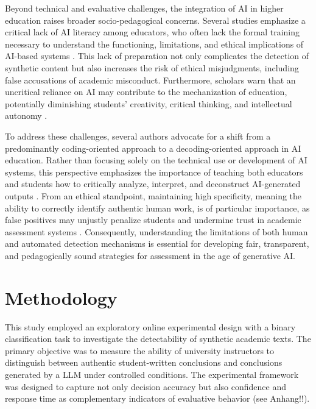 \documentclass[12pt]{article}
\begin{document}
Beyond technical and evaluative challenges, the integration of AI in higher education raises broader socio-pedagogical concerns. Several studies emphasize a critical lack of AI literacy among educators, who often lack the formal training necessary to understand the functioning, limitations, and ethical implications of AI-based systems \autocite[3]{deriba_fairness_2025}. This lack of preparation not only complicates the detection of synthetic content but also increases the risk of ethical misjudgments, including false accusations of academic misconduct. Furthermore, scholars warn that an uncritical reliance on AI may contribute to the mechanization of education, potentially diminishing students' creativity, critical thinking, and intellectual autonomy \autocite[4]{rahimi_ai_2025}.

To address these challenges, several authors advocate for a shift from a predominantly coding-oriented approach to a decoding-oriented approach in AI education. Rather than focusing solely on the technical use or development of AI systems, this perspective emphasizes the importance of teaching both educators and students how to critically analyze, interpret, and deconstruct AI-generated outputs \autocite[5]{rahimi_ai_2025}. From an ethical standpoint, maintaining high specificity, meaning the ability to correctly identify authentic human work, is of particular importance, as false positives may unjustly penalize students and undermine trust in academic assessment systems \autocite[449]{orhani_risks_2025}. Consequently, understanding the limitations of both human and automated detection mechanisms is essential for developing fair, transparent, and pedagogically sound strategies for assessment in the age of generative AI.

\newpage
\section{Methodology}

This study employed an exploratory online experimental design with a binary classification task to investigate the detectability of synthetic academic texts. The primary objective was to measure the ability of university instructors to distinguish between authentic student-written conclusions and conclusions generated by a LLM under controlled conditions. The experimental framework was designed to capture not only decision accuracy but also confidence and response time as complementary indicators of evaluative behavior (see Anhang!!).
\end{document}
